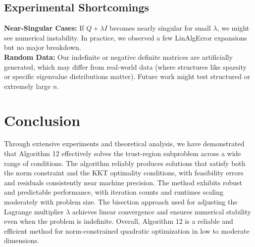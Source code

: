 \documentclass[12pt]{article}
\begin{document}
\subsection{Experimental Shortcomings}

\textbf{Near-Singular Cases:} If $Q+ \lambda I$ becomes nearly singular for small $\lambda$, we might see numerical instability. In practice, we observed a few LinAlgError expansions but no major breakdown.\\
\textbf{Random Data:} Our indefinite or negative definite matrices are artificially generated, which may differ from real-world data (where structures like sparsity or specific eigenvalue distributions matter). Future work might test structured or extremely large $n$.





\section{Conclusion}


Through extensive experiments and theoretical analysis, we have demonstrated that Algorithm 12 effectively solves the trust-region subproblem across a wide range of conditions. The algorithm reliably produces solutions that satisfy both the norm constraint and the KKT optimality conditions, with feasibility errors and residuals consistently near machine precision. The method exhibits robust and predictable performance, with iteration counts and runtimes scaling moderately with problem size. The bisection approach used for adjusting the Lagrange multiplier $\lambda$ achieves linear convergence and ensures numerical stability even when the problem is indefinite. Overall, Algorithm 12 is a reliable and efficient method for norm-constrained quadratic optimization in low to moderate dimensions.
\end{document}

